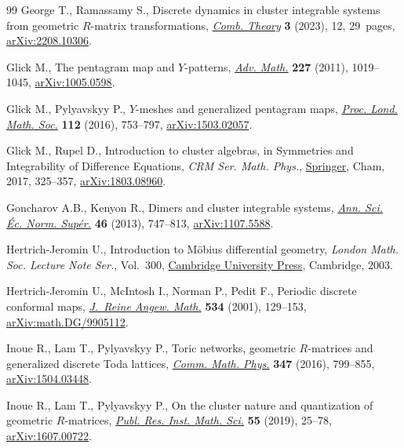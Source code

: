 \documentclass[pdftex]{sigma}
\numberwithin{equation}{section}
\begin{document}
\begin{thebibliography}{99}
George T., Ramassamy S., Discrete dynamics in cluster integrable systems from
 geometric {$R$}-matrix transformations,
 \href{https://doi.org/10.5070/c63261990}{\textit{Comb. Theory}} \textbf{3}
 (2023), 12, 29~pages,
 \href{http://arxiv.org/abs/2208.10306}{arXiv:2208.10306}.

Glick M., The pentagram map and {$Y$}-patterns,
 \href{https://doi.org/10.1016/j.aim.2011.02.018}{\textit{Adv. Math.}}
 \textbf{227} (2011), 1019--1045,
 \href{http://arxiv.org/abs/1005.0598}{arXiv:1005.0598}.

Glick M., Pylyavskyy P., {$Y$}-meshes and generalized pentagram maps,
 \href{https://doi.org/10.1112/plms/pdw007}{\textit{Proc. Lond. Math. Soc.}}
 \textbf{112} (2016), 753--797,
 \href{http://arxiv.org/abs/1503.02057}{arXiv:1503.02057}.

Glick M., Rupel D., Introduction to cluster algebras, in Symmetries and
 Integrability of Difference Equations, \textit{CRM Ser. Math. Phys.},
 \href{https://doi.org/10.1007/978-3-319-56666-5_7}{Springer}, Cham, 2017,
 325--357, \href{http://arxiv.org/abs/1803.08960}{arXiv:1803.08960}.

Goncharov A.B., Kenyon R., Dimers and cluster integrable systems,
 \href{https://doi.org/10.24033/asens.2201}{\textit{Ann. Sci. \'Ec. Norm.
 Sup\'er.}} \textbf{46} (2013), 747--813,
 \href{http://arxiv.org/abs/1107.5588}{arXiv:1107.5588}.

Hertrich-Jeromin U., Introduction to {M}\"obius differential geometry,
 \textit{London Math. Soc. Lecture Note Ser.}, Vol.~300,
 \href{https://doi.org/10.1017/CBO9780511546693}{Cambridge University Press},
 Cambridge, 2003.

Hertrich-Jeromin U., McIntosh I., Norman P., Pedit F., Periodic discrete
 conformal maps, \href{https://doi.org/10.1515/crll.2001.038}{\textit{J.~Reine
 Angew. Math.}} \textbf{534} (2001), 129--153,
 \href{http://arxiv.org/abs/math.DG/9905112}{arXiv:math.DG/9905112}.

Inoue R., Lam T., Pylyavskyy P., Toric networks, geometric {$R$}-matrices and
 generalized discrete {T}oda lattices,
 \href{https://doi.org/10.1007/s00220-016-2739-z}{\textit{Comm. Math. Phys.}}
 \textbf{347} (2016), 799--855,
 \href{http://arxiv.org/abs/1504.03448}{arXiv:1504.03448}.

Inoue R., Lam T., Pylyavskyy P., On the cluster nature and quantization of
 geometric {$R$}-matrices,
 \href{https://doi.org/10.4171/PRIMS/55-1-2}{\textit{Publ. Res. Inst. Math.
 Sci.}} \textbf{55} (2019), 25--78,
 \href{http://arxiv.org/abs/1607.00722}{arXiv:1607.00722}.


\end{thebibliography}
\end{document}

